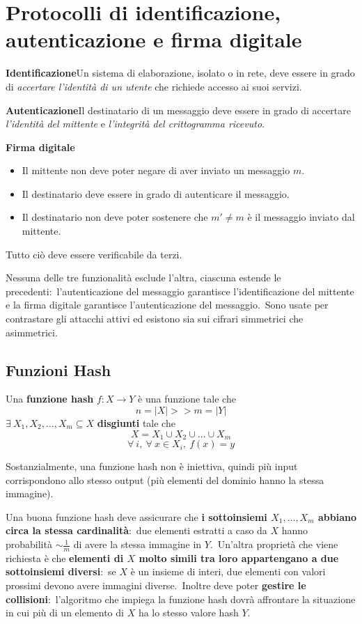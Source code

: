 \chapter{Protocolli di identificazione, autenticazione e firma digitale}

\textbf{Identificazione}\quad Un sistema di elaborazione, isolato o in rete, deve essere in grado di \textit{accertare l'identità di un utente} che richiede accesso ai suoi servizi.\

\vspace{12pt}
\noindent\textbf{Autenticazione}\quad Il destinatario di un messaggio deve essere in grado di accertare \textit{l'identità del mittente} e \textit{l'integrità del crittogramma ricevuto}.\

\vspace{12pt}
\noindent\textbf{Firma digitale}
\begin{itemize}
    \item Il mittente non deve poter negare di aver inviato un messaggio $m$.
    \item Il destinatario deve essere in grado di autenticare il messaggio.
    \item Il destinatario non deve poter sostenere che $m' \neq m$ è il messaggio inviato dal mittente.
\end{itemize}
Tutto ciò deve essere verificabile da terzi.

\vspace{12pt}
\noindent Nessuna delle tre funzionalità esclude l'altra, ciascuna estende le precedenti:\ l'autenticazione del messaggio garantisce l'identificazione del mittente e la firma digitale garantisce l'autenticazione del messaggio.\
Sono usate per contrastare gli attacchi attivi ed esistono sia sui cifrari simmetrici che asimmetrici.

\section{Funzioni Hash}

Una \textbf{funzione hash} $f: X \rightarrow Y$ è una funzione tale che
\[n = |X| >> m = |Y|\]
$\exists\ X_1, X_2,\dots, X_m \subseteq X$ \textbf{disgiunti} tale che
\[ X = X_1 \cup X_2 \cup \dots \cup X_m\]
\[\forall\ i,\ \forall\ x \in X_i,\ f(x) = y\]

\noindent Sostanzialmente, una funzione hash non è iniettiva, quindi più input corrispondono allo stesso output (più elementi del dominio hanno la stessa immagine).\

Una buona funzione hash deve assicurare che \textbf{i sottoinsiemi $X_1, \dots, X_m$ abbiano circa la stessa cardinalità}:\ due elementi estratti a caso da $X$ hanno probabilità $\sim \frac{1}{m}$ di avere la stessa immagine in $Y$.\
Un'altra proprietà che viene richiesta è che \textbf{elementi di $X$ molto simili tra loro appartengano a due sottoinsiemi diversi}:\ se $X$ è un insieme di interi, due elementi con valori prossimi devono avere immagini diverse.\
Inoltre deve poter \textbf{gestire le collisioni}:\ l'algoritmo che impiega la funzione hash dovrà affrontare la situazione in cui più di un elemento di $X$ ha lo stesso valore hash $Y$.\

